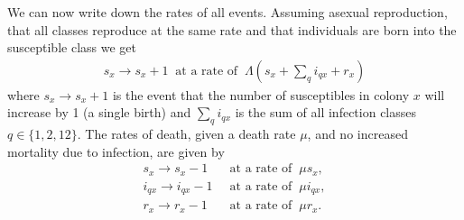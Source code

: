 We can now write down the rates of all events. 
Assuming asexual reproduction, that all classes reproduce at the same rate and that individuals are born into the susceptible class we get
\begin{align}
  s_x \rightarrow s_x + 1 \;\;\text{at a rate of}\;\; \Lambda\left( s_{x}+\sum_q i_{qx} + r_{x}\right) 
\end{align}
where $s_x \rightarrow s_x + 1$ is the event that the number of susceptibles in colony $x$ will increase by 1 (a single birth) and $\sum_q i_{qx}$ is the sum of all infection classes $q \in \{1, 2, 12\}$.
The rates of death, given a death rate $\mu$, and no increased mortality due to infection, are given by
\begin{align}
  s_x \rightarrow s_x-1  &\;\;\text{at a rate of}\;\; \mu s_x, \\
  i_{qx}  \rightarrow i_{qx}-1 &\;\;\text{at a rate of}\;\; \mu i_{qx},\\
  r_x  \rightarrow r_x-1 &\;\;\text{at a rate of}\;\; \mu r_x.
\end{align}


